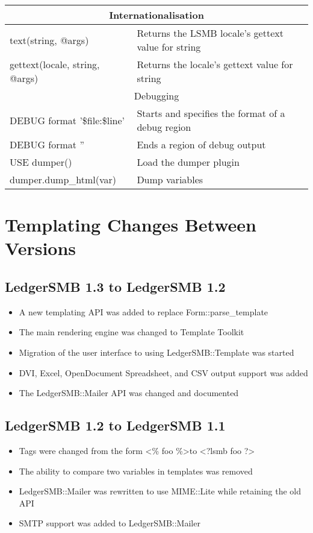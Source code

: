 \documentclass[english]{article}
\newcommand{\pitag}[1]{\textless?lsmb #1 ?\textgreater}
\newcommand{\tg}{\textgreater}
\newcommand{\tl}{\textless}
\newcommand{\lsmb}{LedgerSMB }
\newcommand{\lsmbn}{LedgerSMB}
\newcommand{\lsmbt}{LedgerSMB::Template}
\begin{document}
\begin{tabular}{|l|p{7cm}|}
\hline
\multicolumn{2}{|c|}{Internationalisation}\\
\hline
text(string, @args) & Returns the LSMB locale's gettext value for string\\
gettext(locale, string, @args) & Returns the locale's gettext value for string\\
\hline
\multicolumn{2}{|c|}{Debugging}\\
\hline
DEBUG format '\$file:\$line' & Starts and specifies the format of a debug region\\
DEBUG format '' & Ends a region of debug output\\
USE dumper() & Load the dumper plugin\\
dumper.dump\_html(var) & Dump variables\\
\hline
\end{tabular}

\section{Templating Changes Between Versions}
\subsection{\lsmb 1.3 to \lsmb 1.2}
\begin{itemize}
\item A new templating API was added to replace Form::parse\_template
\item The main rendering engine was changed to Template Toolkit
\item Migration of the user interface to using \lsmbt{ }was started
\item DVI, Excel, OpenDocument Spreadsheet, and CSV output support was added
\item The \lsmbn::Mailer API was changed and documented
\end{itemize}

\subsection{\lsmb 1.2 to \lsmb 1.1}
\begin{itemize}
\item Tags were changed from the form \tl\% foo \%\tg to \pitag{foo}
\item The ability to compare two variables in templates was removed
\item \lsmbn::Mailer was rewritten to use MIME::Lite while retaining the old API
\item SMTP support was added to \lsmbn::Mailer
\end{itemize}
\end{document}
